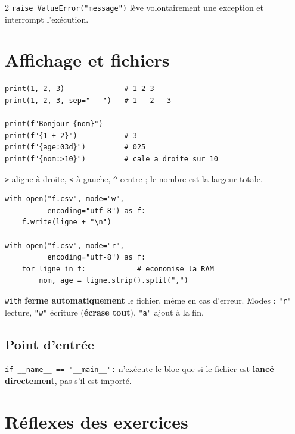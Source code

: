 \documentclass[a4paper,10pt]{article}
\newcommand{\co}[1]{\texttt{\textcolor{codefg}{#1}}}
\begin{document}
\begin{multicols}{2}
\vspace{0.4em}
\co{raise ValueError("message")} lève volontairement une exception et
interrompt l'exécution.

\section{Affichage et fichiers}

\begin{lstlisting}
print(1, 2, 3)              # 1 2 3
print(1, 2, 3, sep="---")   # 1---2---3

print(f"Bonjour {nom}")
print(f"{1 + 2}")           # 3
print(f"{age:03d}")         # 025
print(f"{nom:>10}")         # cale a droite sur 10
\end{lstlisting}

\co{>} aligne à droite, \co{<} à gauche, \co{\textasciicircum} centre ; le
nombre est la largeur totale.

\begin{lstlisting}
with open("f.csv", mode="w",
          encoding="utf-8") as f:
    f.write(ligne + "\n")

with open("f.csv", mode="r",
          encoding="utf-8") as f:
    for ligne in f:            # economise la RAM
        nom, age = ligne.strip().split(",")
\end{lstlisting}

\co{with} \textbf{ferme automatiquement} le fichier, même en cas d'erreur.
Modes : \co{"r"} lecture, \co{"w"} écriture (\textbf{écrase tout}), \co{"a"}
ajout à la fin.

\subsection{Point d'entrée}
\co{if \_\_name\_\_ == "\_\_main\_\_":} n'exécute le bloc que si le fichier est
\textbf{lancé directement}, pas s'il est importé.

\section{Réflexes des exercices}


\end{multicols}
\end{document}
